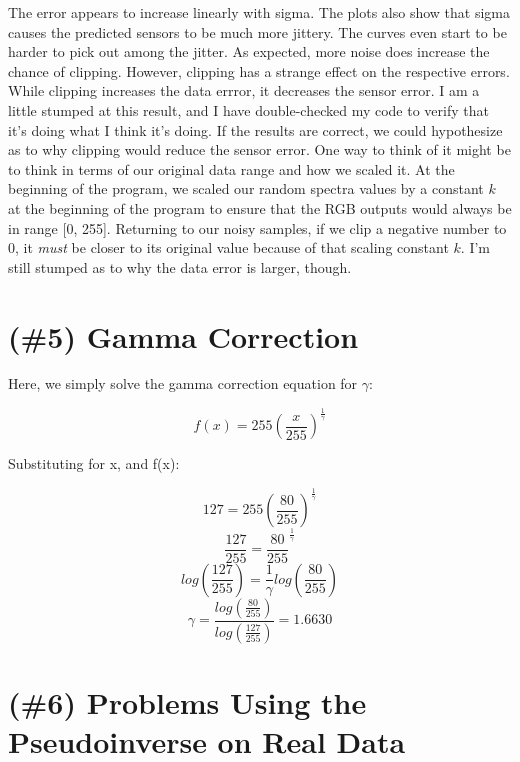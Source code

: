 \documentclass{article}
\begin{document}
The error appears to increase linearly with sigma. The plots also show that 
sigma causes the predicted sensors to be much more jittery. The curves even start 
to be harder to pick out among the jitter. As expected, more noise does increase 
the chance of clipping. However, clipping has a strange effect on the respective 
errors. While clipping increases the data errror, it decreases the sensor error. I 
am a little stumped at this result, and I have double-checked my code to verify 
that it's doing what I think it's doing. If the results are correct, we could 
hypothesize as to why clipping would reduce the sensor error. One way to think 
of it might be to think in terms of our original data range and how we scaled it. 
At the beginning of the program, we scaled our random spectra values by a constant $ k $ at 
the beginning of the program to ensure that the RGB outputs would always be in 
range [0, 255]. Returning to our noisy samples, if we clip a negative number to 
0, it \textit{must} be closer to its original value because of that scaling 
constant $ k $. I'm still stumped as to why the data error is larger, though.

\section{(\#5) Gamma Correction}

Here, we simply solve the gamma correction equation for $\gamma$:

$$
f(x) = 255 (\frac{x}{255})^{\frac{1}{\gamma}}
$$

Substituting for x, and f(x):

$$
127 = 255 (\frac{80}{255})^{\frac{1}{\gamma}}
$$
$$
\frac{127}{255} = \frac{80}{255}^{\frac{1}{\gamma}}
$$
$$
log(\frac{127}{255}) = \frac{1}{\gamma} log(\frac{80}{255})
$$
$$
\gamma = \frac{log(\frac{80}{255})}{log(\frac{127}{255})} = 1.6630
$$

\section{(\#6) Problems Using the Pseudoinverse on Real Data}
\end{document}
